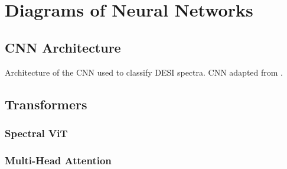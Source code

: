 \chapter{Diagrams of Neural Networks}
\label{chap:NN_Architecture}
\section{\textcite{Sepeku2022} CNN Architecture}
\label{app:CNN}

\begin{table}
    \centering
    \sffamily
    \resizebox{\linewidth}{!}{}
    \caption{Architecture of the CNN used to classify DESI spectra. CNN adapted 
from \textcite{Sepeku2022}.} 
    \label{tab:cnn_architecture}
\end{table}

\section{Transformers}
\label{app:transformer}

\subsection{Spectral ViT}
\label{app:SpecViT}

\subsection{Multi-Head Attention}
\label{app:MHA}


